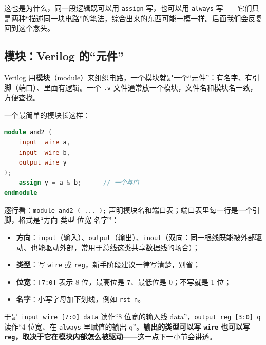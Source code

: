 这也是为什么，同一段逻辑既可以用 \texttt{assign} 写，也可以用 \texttt{always} 写——它们只是两种“描述同一块电路”的笔法，综合出来的东西可能一模一样。后面我们会反复回到这个念头。


\subsection{模块：Verilog 的“元件”}

Verilog 用\textbf{模块}（module）来组织电路，一个模块就是一个“元件”：有名字、有引脚（端口）、里面有逻辑。一个 \texttt{.v} 文件通常放一个模块，文件名和模块名一致，方便查找。

一个最简单的模块长这样：

\begin{lstlisting}[language=Verilog,numbers=none]
module and2 (
    input  wire a,
    input  wire b,
    output wire y
);
    assign y = a & b;      // 一个与门
endmodule
\end{lstlisting}

逐行看：\texttt{module and2 ( ... );} 声明模块名和端口表；端口表里每一行是一个引脚，格式是“方向 类型 位宽 名字”：

\begin{itemize}
  \item \textbf{方向}：\texttt{input}（输入）、\texttt{output}（输出）、\texttt{inout}（双向：同一根线既能被外部驱动、也能驱动外部，常用于总线这类共享数据线的场合）；
  \item \textbf{类型}：写 \texttt{wire} 或 \texttt{reg}，新手阶段建议一律写清楚，别省；
  \item \textbf{位宽}：\texttt{[7:0]} 表示 8 位，最高位是 7、最低位是 0；不写就是 1 位；
  \item \textbf{名字}：小写字母加下划线，例如 \texttt{rst\_n}。
\end{itemize}

于是 \texttt{input wire [7:0] data} 读作“8 位宽的输入线 data”，\texttt{output reg [3:0] q} 读作“4 位宽、在 \texttt{always} 里赋值的输出 q”。\textbf{输出的类型可以写 \texttt{wire} 也可以写 \texttt{reg}，取决于它在模块内部怎么被驱动}——这一点下一小节会讲透。

